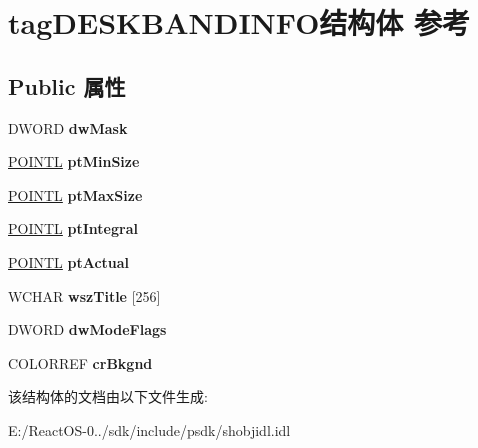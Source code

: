 \hypertarget{structtag_d_e_s_k_b_a_n_d_i_n_f_o}{}\section{tag\+D\+E\+S\+K\+B\+A\+N\+D\+I\+N\+F\+O结构体 参考}
\label{structtag_d_e_s_k_b_a_n_d_i_n_f_o}
\subsection*{Public 属性}
\begin{DoxyCompactItemize}
\item 
\mbox{\label{structtag_d_e_s_k_b_a_n_d_i_n_f_o_a37f504a10bd91c3c3baf0590a86ae4d3}} 
D\+W\+O\+RD {\bfseries dw\+Mask}
\item 
\mbox{\label{structtag_d_e_s_k_b_a_n_d_i_n_f_o_af288c53b17a18f3edcb9b4fa77d0c993}} 
\hyperlink{struct___p_o_i_n_t_l}{P\+O\+I\+N\+TL} {\bfseries pt\+Min\+Size}
\item 
\mbox{\label{structtag_d_e_s_k_b_a_n_d_i_n_f_o_a7bed6e54d71a6e5710874e09aec30278}} 
\hyperlink{struct___p_o_i_n_t_l}{P\+O\+I\+N\+TL} {\bfseries pt\+Max\+Size}
\item 
\mbox{\label{structtag_d_e_s_k_b_a_n_d_i_n_f_o_aa651238255bf88127d003aeea2840383}} 
\hyperlink{struct___p_o_i_n_t_l}{P\+O\+I\+N\+TL} {\bfseries pt\+Integral}
\item 
\mbox{\label{structtag_d_e_s_k_b_a_n_d_i_n_f_o_a56ca80cbaa3d18c0970db05be5f305c9}} 
\hyperlink{struct___p_o_i_n_t_l}{P\+O\+I\+N\+TL} {\bfseries pt\+Actual}
\item 
\mbox{\label{structtag_d_e_s_k_b_a_n_d_i_n_f_o_aaea6f92df9c28613e9ecfc7ce0edee5a}} 
W\+C\+H\+AR {\bfseries wsz\+Title} \mbox{[}256\mbox{]}
\item 
\mbox{\label{structtag_d_e_s_k_b_a_n_d_i_n_f_o_ab806ae428fc44a81d7cec5f38437a7d3}} 
D\+W\+O\+RD {\bfseries dw\+Mode\+Flags}
\item 
\mbox{\label{structtag_d_e_s_k_b_a_n_d_i_n_f_o_a63f9d266177f089c86b82c1e66b49d73}} 
C\+O\+L\+O\+R\+R\+EF {\bfseries cr\+Bkgnd}
\end{DoxyCompactItemize}


该结构体的文档由以下文件生成\+:\begin{DoxyCompactItemize}
\item 
E\+:/\+React\+O\+S-\/0../sdk/include/psdk/shobjidl.\+idl\end{DoxyCompactItemize}
